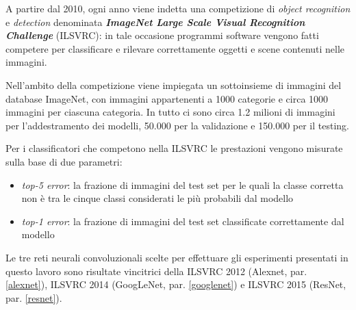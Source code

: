 A partire dal 2010, ogni anno viene indetta una competizione di \textit{object recognition} e \textit{detection} denominata \textbf{\textit{ImageNet Large Scale Visual Recognition Challenge}} (ILSVRC): in tale occasione programmi software vengono fatti competere per classificare e rilevare correttamente oggetti e scene contenuti nelle immagini.

Nell'ambito della competizione viene impiegata un sottoinsieme di immagini del database ImageNet, con immagini appartenenti a 1000 categorie e circa 1000 immagini per ciascuna categoria. In tutto ci sono circa 1.2 milioni di immagini per l'addestramento dei modelli, 50.000 per la validazione e 150.000 per il testing.

Per i classificatori che competono nella ILSVRC le prestazioni vengono misurate sulla base di due parametri:
\begin{itemize}
\item \textit{top-5 error}: la frazione di immagini del test set per le quali la classe corretta non è tra le cinque classi considerati le più probabili dal modello
\item \textit{top-1 error}: la frazione di immagini del test set classificate correttamente dal modello
\end{itemize}

Le tre reti neurali convoluzionali scelte per effettuare gli esperimenti presentati in questo lavoro sono risultate vincitrici della ILSVRC 2012 (Alexnet, par. \ref{alexnet}), ILSVRC 2014 (GoogLeNet, par. \ref{googlenet}) e ILSVRC 2015 (ResNet, par. \ref{resnet}).

